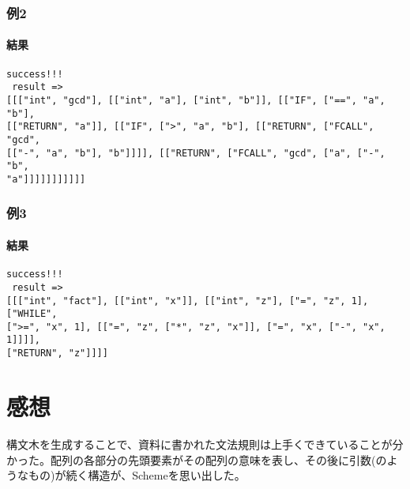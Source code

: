 \documentclass[titlepage, a4paper,12pt]{jarticle}
\begin{document}
\subsubsection{例2}

\paragraph{結果}
\begin{verbatim}
success!!! 
 result => 
[[["int", "gcd"], [["int", "a"], ["int", "b"]], [["IF", ["==", "a", "b"], 
[["RETURN", "a"]], [["IF", [">", "a", "b"], [["RETURN", ["FCALL", "gcd", 
[["-", "a", "b"], "b"]]]], [["RETURN", ["FCALL", "gcd", ["a", ["-", "b", 
"a"]]]]]]]]]]]
\end{verbatim}
\subsubsection{例3}

\paragraph{結果}
\begin{verbatim}
success!!! 
 result => 
[[["int", "fact"], [["int", "x"]], [["int", "z"], ["=", "z", 1], ["WHILE",
[">=", "x", 1], [["=", "z", ["*", "z", "x"]], ["=", "x", ["-", "x", 1]]]], 
["RETURN", "z"]]]]
\end{verbatim}
\section{感想}
構文木を生成することで、資料に書かれた文法規則は上手くできていることが分かった。配列の各部分の先頭要素がその配列の意味を表し、その後に引数(のようなもの)が続く構造が、Schemeを思い出した。
\end{document}
